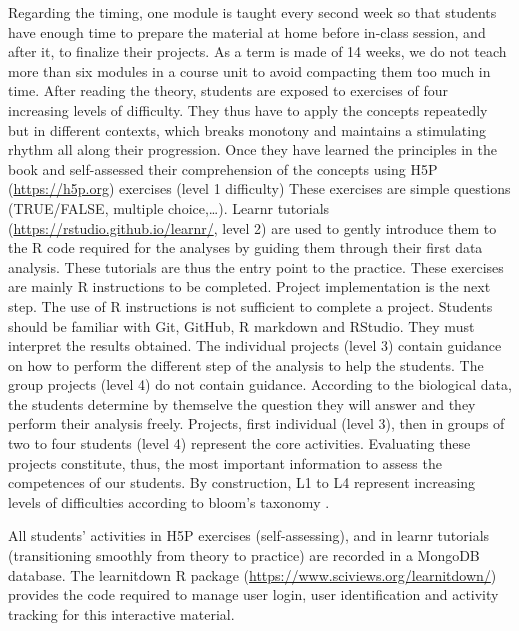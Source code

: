 \documentclass{aims}
\theoremstyle{definition}
\begin{document}
Regarding the timing, one module is taught every second week so that
students have enough time to prepare the material at home before
in-class session, and after it, to finalize their projects. As a term is
made of 14 weeks, we do not teach more than six modules in a course unit
to avoid compacting them too much in time. After reading the theory,
students are exposed to exercises of four increasing levels of
difficulty. They thus have to apply the concepts repeatedly but in
different contexts, which breaks monotony and maintains a stimulating
rhythm all along their progression. Once they have learned the
principles in the book and self-assessed their comprehension of the
concepts using H5P (\url{https://h5p.org}) exercises (level 1
difficulty) These exercises are simple questions (TRUE/FALSE, multiple
choice,\ldots). Learnr tutorials
(\url{https://rstudio.github.io/learnr/}, level 2) are used to gently
introduce them to the R code required for the analyses by guiding them
through their first data analysis. These tutorials are thus the entry
point to the practice. These exercises are mainly R instructions to be
completed. Project implementation is the next step. The use of R
instructions is not sufficient to complete a project. Students should be
familiar with Git, GitHub, R markdown and RStudio. They must interpret
the results obtained. The individual projects (level 3) contain guidance
on how to perform the different step of the analysis to help the
students. The group projects (level 4) do not contain guidance.
According to the biological data, the students determine by themselve
the question they will answer and they perform their analysis freely.
Projects, first individual (level 3), then in groups of two to four
students (level 4) represent the core activities. Evaluating these
projects constitute, thus, the most important information to assess the
competences of our students. By construction, L1 to L4 represent
increasing levels of difficulties according to bloom's taxonomy
\cite{Krathwohl2002}.

All students' activities in H5P exercises (self-assessing), and in
learnr tutorials (transitioning smoothly from theory to practice) are
recorded in a MongoDB database. The learnitdown R package
(\url{https://www.sciviews.org/learnitdown/}) provides the code required
to manage user login, user identification and activity tracking for this
interactive material.
\end{document}
